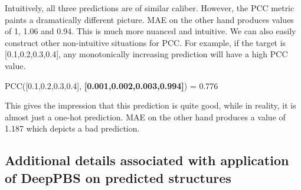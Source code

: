 Intuitively, all three predictions are of similar caliber. However, the PCC metric paints a dramatically different picture. MAE on the other hand produces values of 1, 1.06 and 0.94. This is much more nuanced and intuitive. We can also easily construct other non-intuitive situations for PCC. For example, if the target is [0.1,0.2,0.3,0.4], any monotonically increasing prediction will have a high PCC value.

PCC([0.1,0.2,0.3,0.4], \textbf{[0.001,0.002,0.003,0.994]}) = 0.776

This gives the impression that this prediction is quite good, while in reality, it is almost just a one-hot prediction. MAE on the other hand produces a value of 1.187 which depicts a bad prediction.

\subsection{Additional details associated with application of DeepPBS on predicted structures}

